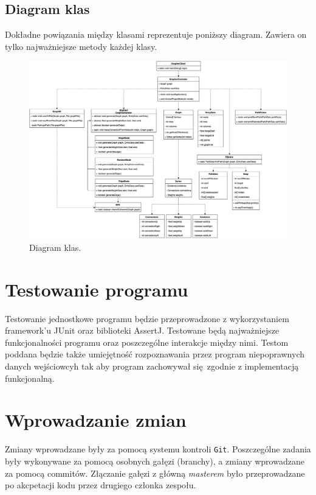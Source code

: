 \documentclass[10pt, a4paper]{report}
\begin{document}
    \subsection{Diagram klas}
    Dokładne powiązania między klasami reprezentuje poniższy diagram. Zawiera on tylko najważniejsze metody każdej klasy.
    \begin{figure}[h]
        \includegraphics[scale=0.29]{ClassDiagram.png}
        \caption{Diagram klas.}
  \end{figure}
  \newpage

    \section{Testowanie programu}
    Testowanie jednostkowe programu będzie przeprowadzone z wykorzystaniem framework'u JUnit oraz biblioteki AssertJ.
    Testowane będą najważniejsze funkcjonalności programu oraz poszczególne interakcje między nimi. 
    Testom poddana będzie także umiejętność rozpoznawania przez program niepoprawnych danych wejściowcyh tak 
    aby program zachowywał się zgodnie z implementacją funkcjonalną.

    \section{Wprowadzanie zmian}
    Zmiany wprowadzane były za pomocą systemu kontroli \texttt{Git}. Poszczególne zadania były wykonywane za pomocą osobnych gałęzi (branchy), a zmiany wprowadzane
     za pomocą commitów. Złączanie gałęzi z główną \textit{masterem} było przeprowadzane po akcpetacji kodu przez drugiego członka zespołu.
\end{document}
